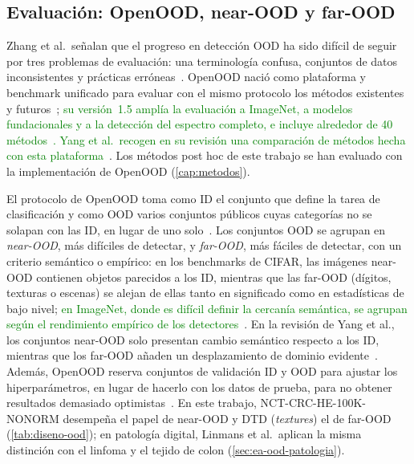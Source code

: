 \subsection{Evaluación: OpenOOD, near-OOD y far-OOD}\label{sec:ea-near-far}

Zhang et al.\ señalan que el progreso en detección OOD ha sido difícil de seguir
por tres problemas de evaluación: una terminología confusa, conjuntos de datos
inconsistentes y prácticas erróneas~\cite{openood15}. OpenOOD nació como
plataforma y benchmark unificado para evaluar con el mismo protocolo los métodos
existentes y futuros~\cite{openood,openood15}; \textcolor{green}{su versión~1.5 amplía la
evaluación a ImageNet, a modelos fundacionales y a la detección del espectro
completo, e incluye alrededor de 40 métodos~\cite{openood15}. Yang et al.\
recogen en su revisión una comparación de métodos hecha con esta
plataforma~\cite{yang2024}}. Los métodos post hoc de este trabajo se han evaluado
con la implementación de OpenOOD (\cref{cap:metodos}).

El protocolo de OpenOOD toma como ID el conjunto que define la tarea de
clasificación y como OOD varios conjuntos públicos cuyas categorías no se solapan
con las ID, en lugar de uno solo~\cite{openood15}. Los conjuntos OOD se agrupan en
\emph{near-OOD}, más difíciles de detectar, y \emph{far-OOD}, más fáciles de detectar, con un criterio
semántico o empírico: en los benchmarks de CIFAR, las imágenes near-OOD contienen
objetos parecidos a los ID, mientras que las far-OOD (dígitos, texturas o escenas)
se alejan de ellas tanto en significado como en estadísticas de bajo nivel; \textcolor{green}{en
ImageNet, donde es difícil definir la cercanía semántica, se agrupan según el
rendimiento empírico de los detectores~\cite{openood15}}. En la revisión de Yang
et al., los conjuntos near-OOD solo presentan cambio semántico respecto a los ID,
mientras que los far-OOD añaden un desplazamiento de dominio
evidente~\cite{yang2024}. Además, OpenOOD reserva conjuntos de validación ID y OOD
para ajustar los hiperparámetros, en lugar de hacerlo con los datos de prueba,
para no obtener resultados demasiado optimistas~\cite{openood15}. En este trabajo,
NCT-CRC-HE-100K-NONORM desempeña el papel de near-OOD y DTD (\textit{textures}) el de far-OOD
(\cref{tab:diseno-ood}); en patología digital, Linmans et al.\ aplican la misma
distinción con el linfoma y el tejido de colon (\cref{sec:ea-ood-patologia}).

